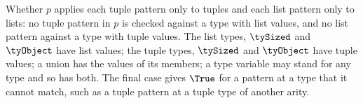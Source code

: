 Whether $p$ applies each tuple pattern only to tuples and each list pattern only to lists: no tuple
pattern in $p$ is checked against a type with list values, and no list pattern against a type with tuple
values. The list types, $\tySized$ and $\tyObject$ have list values; the tuple types, $\tySized$ and
$\tyObject$ have tuple values; a union has the values of its members; a type variable may stand for any type and so has both. The final case gives $\True$ for a
pattern at a type that it cannot match, such as a tuple pattern at a tuple type of another arity.
